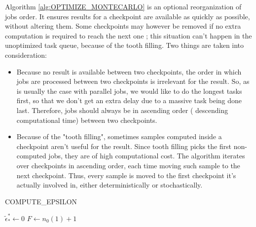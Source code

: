 \documentclass[./thesis.tex]{subfiles}
\begin{document}
Algorithm \ref{alg:OPTIMIZE_MONTECARLO} is an optional reorganization of jobs order. It ensures results for a checkpoint are available as quickly as possible, without altering them. Some checkpoints may however be removed if no extra computation is required to reach the next one ; this situation can't happen in the unoptimized task queue, because of the tooth filling. Two things are taken into consideration:
\begin{itemize}
\item
Because no result is available between two checkpoints, the order in which jobs are processed between two checkpoints is irrelevant for the result. So, as is usually the case with parallel jobs, we would like to do the longest tasks first, so that we don't get an extra delay due to a massive task being done last. Therefore, jobs should always be in ascending order ( descending computational time) between two checkpoints.
\item
Because of the "tooth filling", sometimes samples computed inside a checkpoint aren't useful for the result. Since tooth filling picks the first non-computed jobs, they are of high computational cost. The algorithm iterates over checkpoints in ascending order, each time moving such sample to the next checkpoint. Thus, every sample is moved to the first checkpoint it's actually involved in, either deterministically or stochastically.
\end{itemize}



\begin{algorithm}
	\label{COMPUTE_EPSILON}
	\caption{COMPUTE\_EPSILON}
		\KwResult{ $\tilde \epsilon$}
		$\tilde \epsilon^*_* \gets 0$ \;
		$F \gets n_0(1)+1$ \;		
\end{algorithm}
\end{document}
